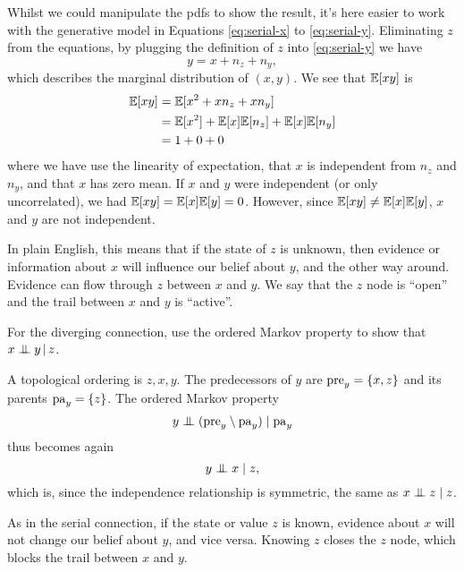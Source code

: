 \begin{exenumerate}
\begin{solution}
       Whilst we could manipulate the pdfs to show the result, it's
       here easier to work with the generative model in Equations
       \eqref{eq:serial-x} to \eqref{eq:serial-y}. Eliminating $z$
       from the equations, by plugging the definition of $z$ into
       \eqref{eq:serial-y} we have
       \begin{equation}
         y = x + n_z + n_y,
       \end{equation}
       which describes the marginal distribution of $(x, y)$. We see
       that $\mathbb{E}[xy]$ is
       \begin{align}
         \mathbb{E}[xy] & = \mathbb{E}[x^2 + xn_z + x n_y]\\
         & =  \mathbb{E}[x^2] + \mathbb{E}[x]\mathbb{E}[n_z] + \mathbb{E}[x]\mathbb{E}[n_y]\\
         & = 1 + 0 + 0
       \end{align}
       where we have use the linearity of expectation, that $x$ is
       independent from $n_z$ and $n_y$, and that $x$ has zero
       mean. If $x$ and $y$ were independent (or only uncorrelated),
       we had $\mathbb{E}[xy] = \mathbb{E}[x]\mathbb{E}[y] = 0$. However, since $\mathbb{E}[xy] \neq \mathbb{E}[x]
       \mathbb{E}[y]$, $x$ and $y$ are not independent.

       In plain English, this means that if the state of $z$ is
       unknown, then evidence or information about $x$ will influence
       our belief about $y$, and the other way around. Evidence can
       flow through $z$ between $x$ and $y$. We say that the $z$ node
       is ``open'' and the trail between $x$ and $y$ is ``active''.
       
     \end{solution}
 \item For the diverging connection, use the ordered Markov property
   to show that $x \mathrel{\perp\mspace{-10mu}\perp} y \,|\, z$.
    \begin{solution}
     A topological ordering is $z, x, y$. The predecessors of
     $y$ are $\mathrm{pre}_y = \{x, z\}$ and its parents $\mathrm{pa}_y = \{z\}$. The
     ordered Markov property
     \begin{equation}
       y \mathrel{\perp\mspace{-10mu}\perp} ( \mathrm{pre}_y \setminus \mathrm{pa}_y ) \mid \mathrm{pa}_y
     \end{equation}
     thus becomes again
     \begin{equation}
       y \mathrel{\perp\mspace{-10mu}\perp} x \mid z,
     \end{equation}
     which is, since the independence relationship is symmetric, the
     same as $x \mathrel{\perp\mspace{-10mu}\perp} z \mid z$.

     As in the serial connection, if the state or value $z$ is known,
     evidence about $x$ will not change our belief about $y$, and vice
     versa. Knowing $z$ closes the $z$ node, which blocks the trail
     between $x$ and $y$.
    \end{solution}


\end{exenumerate}
